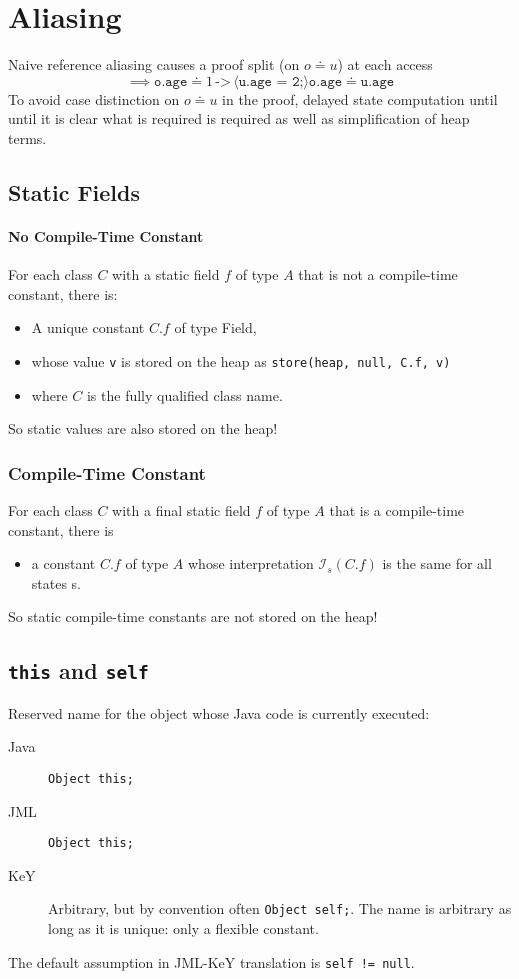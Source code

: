 	\section{Aliasing}
		Naive reference aliasing causes a proof split (on \( o \doteq u \)) at each access
		\begin{equation*}
			\implies \texttt{o.age} \doteq 1 \,\texttt{->}\, \langle \texttt{u.age = 2;} \rangle \texttt{o.age} \doteq \texttt{u.age}
		\end{equation*}
		To avoid case distinction on \( o \doteq u \) in the proof, delayed state computation until until it is clear what is required is required as well as simplification of heap terms.

	\subsection{Static Fields}
		\paragraph{No Compile-Time Constant}
			For each class \(C\) with a static field \(f\) of type \(A\) that is not a compile-time constant, there is:
			\begin{itemize}
				\item A unique constant \( C.f \) of type Field,
				\item whose value \texttt{v} is stored on the heap as \texttt{store(heap, null, C.f, v)}
				\item where \(C\) is the fully qualified class name.
			\end{itemize}
			So static values are also stored on the heap!

		\subsubsection{Compile-Time Constant}
			For each class \(C\) with a final static field \(f\) of type \(A\) that is a compile-time constant, there is
			\begin{itemize}
				\item a constant \(C.f\) of type \(A\) whose interpretation \( \mathcal{I}_s(C.f) \) is the same for all states s.
			\end{itemize}
			So static compile-time constants are not stored on the heap!

	\subsection{\texttt{this} and \texttt{self}}
		Reserved name for the object whose Java code is currently executed:
		\begin{description}
			\item[Java] \texttt{Object this;}
			\item[JML]  \texttt{Object this;}
			\item[KeY]  Arbitrary, but by convention often \texttt{Object self;}. The name is arbitrary as long as it is unique: only a flexible constant.
		\end{description}
		The default assumption in JML-KeY translation is \texttt{self != null}.

